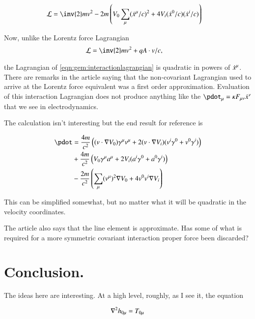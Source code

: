 \begin{align}\label{eqn:gem:interactionlagrangian}
\LL &= \inv{2} m v^2 - 2m \left( V_0 \sum_\mu (\xdot^\mu / c)^2 + 4 V_i (\xdot^0/c) (\xdot^i/c) \right)
\end{align}

Now, unlike the Lorentz force Lagrangian
\begin{align*}
\LL &= \inv{2} m v^2 + q A \cdot v/c,
\end{align*}

the Lagrangian of \ref{eqn:gem:interactionlagrangian} is quadratic in powers of $\dot{x}^\mu$.  
There are remarks in the article saying that the non-covariant Lagrangian used to arrive at the Lorentz force equivalent was a first order approximation.
Evaluation of this interaction Lagrangian does not produce anything like the 
$\pdot_\mu = \kappa F_{\mu\nu}\xdot^\nu$ that we see in electrodynamics.

The calculation isn't interesting but the end result for reference is

\begin{align*}
\pdot
&= \frac{4m}{c^2} \left( (v \cdot \grad V_0) \gamma^\mu v^\mu + 2 (v \cdot \grad V_i) (v^i \gamma^0 + v^0 \gamma^i) \right) \\
&+ \frac{4m}{c^2} \left( V_0 \gamma^\mu a^\mu + 2V_i (a^i \gamma^0 + a^0 \gamma^i) \right) \\
&- \frac{2m}{c^2} \left( \sum_\mu (v^\mu)^2 \grad V_0 + 4 v^0 v^i \grad V_i \right)
\end{align*}

This can be simplified somewhat, but no matter what it will be quadratic in the velocity coordinates.

The article also says that the line element is approximate.
Has some of what
is required for a more symmetric covariant interaction proper force been
discarded?

\section{Conclusion. }

The ideas here are interesting.  At a high level, roughly, as I see it, the equation

\begin{align*}
\nabla^2 h_{0\mu} = T_{0\mu}
\end{align*}

